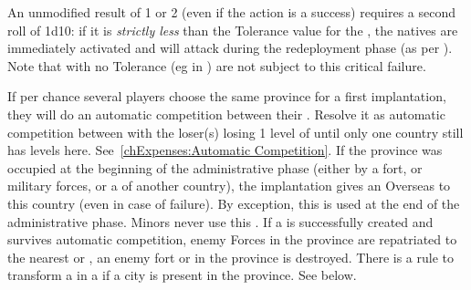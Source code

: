 \aparag\label{chExpenses:Colony:Critical failure} An unmodified result of 1 or
2 (even if the action is a success) requires a second roll of 1d10: if it is
\emph{strictly less} than the Tolerance value for the \Area, the natives are
immediately activated and will attack during the redeployment phase (as per
).
\bparag Note that \Area with no Tolerance (eg in ) are not
subject to this critical failure.

\bparag If per chance several players choose the same province for a first
\COL implantation, they will do an automatic competition between their
\COL. Resolve it as automatic competition between \TP with the loser(s) losing
1 level of \COL until only one country still has levels
here. See~\ref{chExpenses:Automatic Competition}.
\bparag If the province was occupied at the beginning of the administrative
phase (either by a fort, or military forces, or a \TP of another country), the
implantation gives an Overseas \CB to this country (even in case of
failure). By exception, this \CB is used at the end of the administrative
phase. Minors never use this \CB.
\bparag If a \COL is successfully created and survives automatic competition,
enemy Forces in the province are repatriated to the nearest \TP or \COL, an
enemy fort or \TP in the province is destroyed.
\bparag There is a rule to transform a \TP in a \COL if a city is present in
the province. See below.

